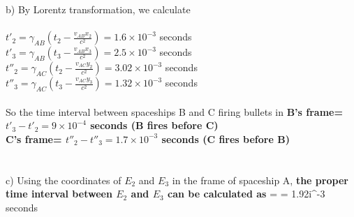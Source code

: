 \documentclass{article}
\begin{document}
b) By Lorentz transformation, we calculate\\\\
\(t'_2 = \gamma_{AB}(t_2 - \frac{v_{AB}x_2}{c^2}) = 1.6\times10^{-3}\) seconds\\
\(t'_3 = \gamma_{AB}(t_3 - \frac{v_{AB}x_3}{c^2}) = 2.5\times10^{-3}\) seconds\\
\(t''_2 = \gamma_{AC}(t_2 - \frac{v_{AC}y_2}{c^2}) = 3.02\times10^{-3}\) seconds\\
\(t''_3 = \gamma_{AC}(t_3 - \frac{v_{AC}y_3}{c^2}) = 1.32\times10^{-3}\) seconds\\
\\
So the time interval between spaceships B and C firing bullets in\newline
\textbf{B's frame= \(t'_3 - t'_2 = 9\times10^{-4}\) seconds (B fires before C)}\\
\textbf{C's frame= \(t''_2 - t''_3 = 1.7\times10^{-3}\) seconds (C fires before B)}\\
\\\\
c) Using the coordinates of \(E_2\) and \(E_3\) in the frame of spaceship A,\textbf{ the proper time interval between \(E_2\) and \(E_3\) can be calculated as}
\displaymath \Delta\tau=  = 1.92i^{-3} seconds
\newline
\\\\
\end{document}
